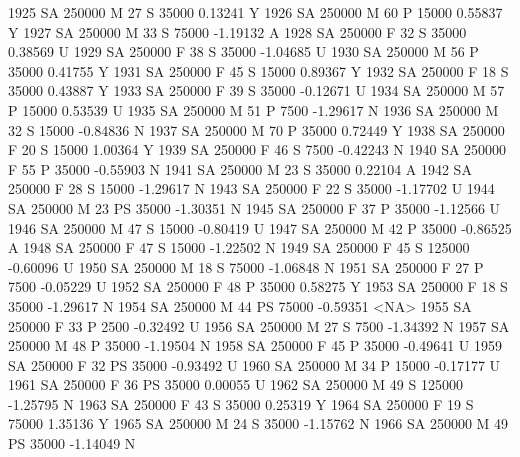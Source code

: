 \documentclass{article}
\begin{document}
\begin{Schunk}
\begin{Soutput}
1925     SA     250000   M  27         S  35000   0.13241    Y
1926     SA     250000   M  60         P  15000   0.55837    Y
1927     SA     250000   M  33         S  75000  -1.19132    A
1928     SA     250000   F  32         S  35000   0.38569    U
1929     SA     250000   F  38         S  35000  -1.04685    U
1930     SA     250000   M  56         P  35000   0.41755    Y
1931     SA     250000   F  45         S  15000   0.89367    Y
1932     SA     250000   F  18         S  35000   0.43887    Y
1933     SA     250000   F  39         S  35000  -0.12671    U
1934     SA     250000   M  57         P  15000   0.53539    U
1935     SA     250000   M  51         P   7500  -1.29617    N
1936     SA     250000   M  32         S  15000  -0.84836    N
1937     SA     250000   M  70         P  35000   0.72449    Y
1938     SA     250000   F  20         S  15000   1.00364    Y
1939     SA     250000   F  46         S   7500  -0.42243    N
1940     SA     250000   F  55         P  35000  -0.55903    N
1941     SA     250000   M  23         S  35000   0.22104    A
1942     SA     250000   F  28         S  15000  -1.29617    N
1943     SA     250000   F  22         S  35000  -1.17702    U
1944     SA     250000   M  23        PS  35000  -1.30351    N
1945     SA     250000   F  37         P  35000  -1.12566    U
1946     SA     250000   M  47         S  15000  -0.80419    U
1947     SA     250000   M  42         P  35000  -0.86525    A
1948     SA     250000   F  47         S  15000  -1.22502    N
1949     SA     250000   F  45         S 125000  -0.60096    U
1950     SA     250000   M  18         S  75000  -1.06848    N
1951     SA     250000   F  27         P   7500  -0.05229    U
1952     SA     250000   F  48         P  35000   0.58275    Y
1953     SA     250000   F  18         S  35000  -1.29617    N
1954     SA     250000   M  44        PS  75000  -0.59351 <NA>
1955     SA     250000   F  33         P   2500  -0.32492    U
1956     SA     250000   M  27         S   7500  -1.34392    N
1957     SA     250000   M  48         P  35000  -1.19504    N
1958     SA     250000   F  45         P  35000  -0.49641    U
1959     SA     250000   F  32        PS  35000  -0.93492    U
1960     SA     250000   M  34         P  15000  -0.17177    U
1961     SA     250000   F  36        PS  35000   0.00055    U
1962     SA     250000   M  49         S 125000  -1.25795    N
1963     SA     250000   F  43         S  35000   0.25319    Y
1964     SA     250000   F  19         S  75000   1.35136    Y
1965     SA     250000   M  24         S  35000  -1.15762    N
1966     SA     250000   M  49        PS  35000  -1.14049    N

\end{Soutput}
\end{Schunk}
\end{document}
